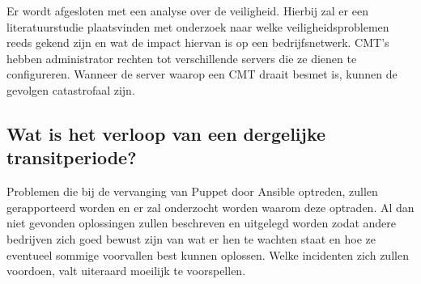Er wordt afgesloten met een analyse over de veiligheid. Hierbij zal er een literatuurstudie plaatsvinden met onderzoek naar welke veiligheidsproblemen reeds gekend zijn en wat de impact hiervan is op een bedrijfsnetwerk. \gls{CMT}'s hebben administrator rechten tot verschillende servers die ze dienen te configureren. Wanneer de server waarop een \gls{CMT} draait besmet is, kunnen de gevolgen catastrofaal zijn.

\subsection{Wat is het verloop van een dergelijke transitperiode?}

Problemen die bij de vervanging van Puppet door Ansible optreden, zullen gerapporteerd worden en er zal onderzocht worden waarom deze optraden. Al dan niet gevonden oplossingen zullen beschreven en uitgelegd worden zodat andere bedrijven zich goed bewust zijn van wat er hen te wachten staat en hoe ze eventueel sommige voorvallen best kunnen oplossen. Welke incidenten zich zullen voordoen, valt uiteraard moeilijk te voorspellen. 




